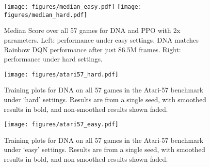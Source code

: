 \documentclass{article}
\begin{document}
\begin{figure}[h]
    \centering
    \texttt{[image: figures/median\_easy.pdf]}
    \texttt{[image: figures/median\_hard.pdf]}
    \caption{Median Score over all 57 games for DNA and PPO with 2x parameters. Left: performance under easy settings. DNA matches Rainbow DQN performance after just 86.5M frames. Right: performance under hard settings.}
    \label{fig:a57_median_plot}
\end{figure}

\begin{figure}[h]
    \centering
    \texttt{[image: figures/atari57\_hard.pdf]}
    \caption{Training plots for DNA on all 57 games in the Atari-57 benchmark under `hard' settings. Results are from a single seed, with smoothed results in bold, and non-smoothed results shown faded.}
    \label{fig:a57_dna_hard}
\end{figure}

\begin{figure}
    \centering
    \texttt{[image: figures/atari57\_easy.pdf]}
    \caption{Training plots for DNA on all 57 games in the Atari-57 benchmark under `easy' settings. Results are from a single seed, with smoothed results in bold, and non-smoothed results shown faded.}
    \label{fig:a57_dna_easy}
\end{figure}
\end{document}
